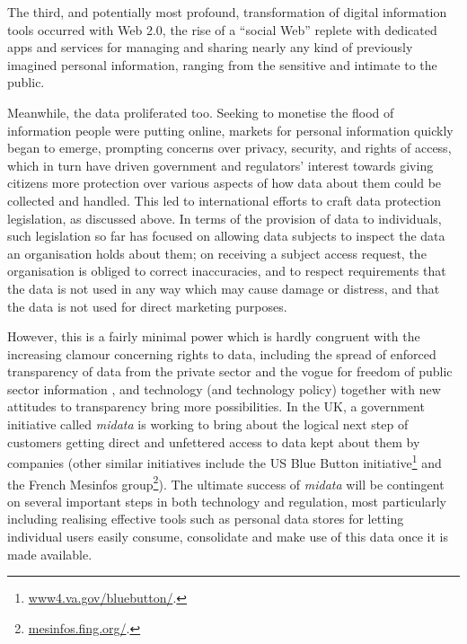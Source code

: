 \documentclass[graybox]{svmult}
\begin{document}


The third, and potentially most profound, transformation of digital information tools occurred with Web 2.0, the rise of a ``social Web'' replete with dedicated apps and services for managing and sharing nearly any kind of previously imagined personal information, ranging from the sensitive and intimate to the public.  

Meanwhile, the data proliferated too. Seeking to monetise the flood of information people were putting online, markets for personal information quickly began to emerge, prompting concerns over privacy, security, and rights of access, which in turn have driven government and regulators’ interest towards giving citizens more protection over various aspects of how data about them could be collected and handled.  This led to international efforts to craft data protection legislation, as discussed above.  In terms of the provision of data to individuals, such legislation so far has focused on allowing data subjects to inspect the data an organisation holds about them; on receiving a subject access request, the organisation is obliged to correct inaccuracies, and to respect requirements that the data is not used in any way which may cause damage or distress, and that the data is not used for direct marketing purposes.

However, this is a fairly minimal power which is hardly congruent with the increasing clamour concerning rights to data, including the spread of enforced transparency of data from the private sector \cite{fung2007} and the vogue for freedom of public sector information \cite{ohara2014}, and technology (and technology policy) together with new attitudes to transparency bring more possibilities. In the UK, a government initiative called \emph{midata} \cite{midata} is working to bring about the logical next step of customers getting direct and unfettered access to data kept about them by companies (other similar initiatives include the US Blue Button initiative\footnote{\url{www4.va.gov/bluebutton/}.} and the French Mesinfos group\footnote{\url{mesinfos.fing.org/}.}).  The ultimate success of \emph{midata} will be contingent on several important steps in both technology and regulation, most particularly including realising effective tools such as personal data stores for letting individual users easily consume, consolidate and make use of this data once it is made available.
\end{document}

